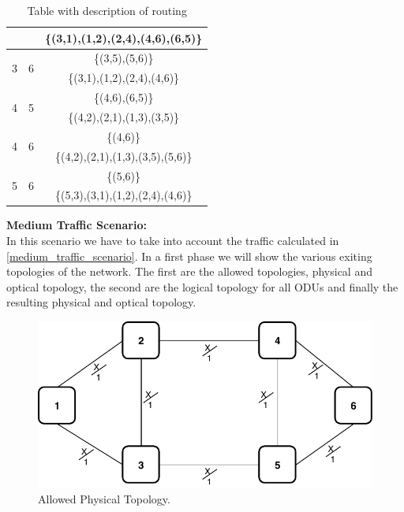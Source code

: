 \begin{table}[h!]
\begin{tabular}{|| c | c | c ||}
 & & \{(3,1),(1,2),(2,4),(4,6),(6,5)\} \\ \hline
 \multirow{2}{*}{3} & \multirow{2}{*}{6} & \{(3,5),(5,6)\}\\
 & & \{(3,1),(1,2),(2,4),(4,6)\} \\ \hline
 \multirow{2}{*}{4} & \multirow{2}{*}{5} & \{(4,6),(6,5)\}\\
 & & \{(4,2),(2,1),(1,3),(3,5)\} \\ \hline
 \multirow{2}{*}{4} & \multirow{2}{*}{6} & \{(4,6)\}\\
 & & \{(4,2),(2,1),(1,3),(3,5),(5,6)\} \\ \hline
 \multirow{2}{*}{5} & \multirow{2}{*}{6} & \{(5,6)\}\\
 & & \{(5,3),(3,1),(1,2),(2,4),(4,6)\} \\
 \hline
\end{tabular}
\caption{Table with description of routing}
\label{path_opaque_protec_ref_low}
\end{table}

\vspace{17pt}
\textbf{Medium Traffic Scenario:}\\

In this scenario we have to take into account the traffic calculated in \ref{medium_traffic_scenario}. In a first phase we will show the various exiting topologies of the network. The first are the allowed topologies, physical and optical topology, the second are the logical topology for all ODUs and finally the resulting physical and optical topology.

\begin{figure}[h!]
\centering
\includegraphics[width=12cm]{sdf/ilp/opaque_protection/figures/allowed_physical_topology}
\caption{Allowed Physical Topology.}
\label{allowed_physical_protectionmedium}
\end{figure}

